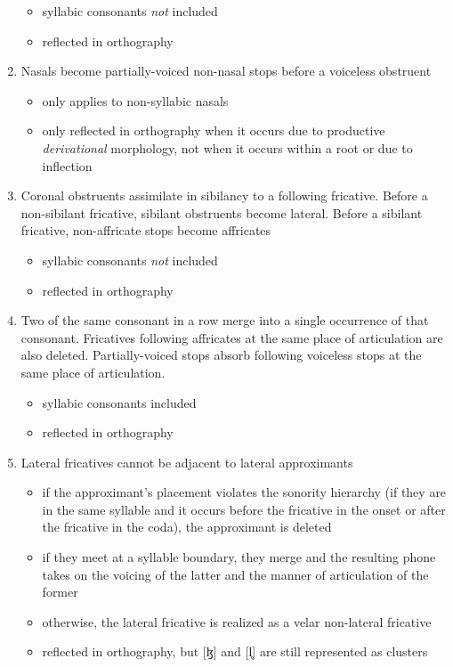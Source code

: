 \documentclass[a4paper,11pt,oneside,openany]{memoir}
\newcommand{\bripa}[1]{[#1]}
\newcommand{\latfrivoic}{ɮ}
\newcommand{\vless}{̥}
\begin{document}
\begin{enumerate}
    \begin{itemize}
        \item syllabic consonants \emph{not} included
        \item reflected in orthography
    \end{itemize}
    \item Nasals become partially-voiced non-nasal stops before a voiceless obstruent
    \begin{itemize}
        \item only applies to non-syllabic nasals
        \item only reflected in orthography when it occurs due to productive \emph{derivational} morphology, not when it occurs within a root or due to inflection
    \end{itemize}
    \item Coronal obstruents assimilate in sibilancy to a following fricative. Before a non-sibilant fricative, sibilant obstruents become lateral. Before a sibilant fricative, non-affricate stops become affricates
    \begin{itemize}
        \item syllabic consonants \emph{not} included
        \item reflected in orthography
    \end{itemize}
    \item Two of the same consonant in a row merge into a single occurrence of that consonant. Fricatives following affricates at the same place of articulation are also deleted. Partially-voiced stops absorb following voiceless stops at the same place of articulation.
    \begin{itemize}
        \item syllabic consonants included
        \item reflected in orthography
    \end{itemize}
    \item Lateral fricatives cannot be adjacent to lateral approximants
    \begin{itemize}
        \item if the approximant's placement violates the sonority hierarchy (if they are in the same syllable and it occurs before the fricative in the onset or after the fricative in the coda), the approximant is deleted
        \item if they meet at a syllable boundary, they merge and the resulting phone takes on the voicing of the latter and the manner of articulation of the former
        \item otherwise, the lateral fricative is realized as a velar non-lateral fricative
        \item reflected in orthography, but \bripa{\latfrivoic} and \bripa{l\vless} are still represented as clusters
    \end{itemize}
\end{enumerate}
\end{document}
